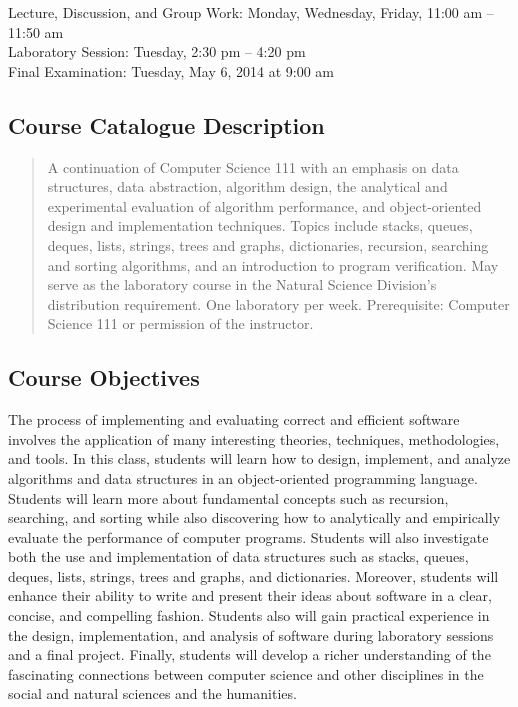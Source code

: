 Lecture, Discussion, and Group Work: Monday, Wednesday, Friday, 11:00 am -- 11:50 am\\
Laboratory Session: Tuesday, 2:30 pm -- 4:20 pm \\
Final Examination: Tuesday, May 6, 2014 at 9:00 am

\subsection*{Course Catalogue Description}

\begin{quote}

  A continuation of Computer Science 111 with an emphasis on data structures, data abstraction, algorithm design, the
  analytical and experimental evaluation of algorithm performance, and object-oriented design and implementation
  techniques. Topics include stacks, queues, deques, lists, strings, trees and graphs, dictionaries, recursion, searching
  and sorting algorithms, and an introduction to program verification. May serve as the laboratory course in the Natural
  Science Division’s distribution requirement. One laboratory per week.  Prerequisite: Computer Science 111 or permission
  of the instructor.

\end{quote}

\subsection*{Course Objectives}

The process of implementing and evaluating correct and efficient software involves the application of many interesting
theories, techniques, methodologies, and tools.  In this class, students will learn how to design, implement, and
analyze algorithms and data structures in an object-oriented programming language. Students will learn more about
fundamental concepts such as recursion, searching, and sorting while also discovering how to analytically and
empirically evaluate the performance of computer programs. Students will also investigate both the use and
implementation of data structures such as stacks, queues, deques, lists, strings, trees and graphs, and dictionaries.
Moreover, students will enhance their ability to write and present their ideas about software in a clear, concise, and
compelling fashion.  Students also will gain practical experience in the design, implementation, and analysis of
software during laboratory sessions and a final project. Finally, students will develop a richer understanding of the
fascinating connections between computer science and other disciplines in the social and natural sciences and the
humanities.

